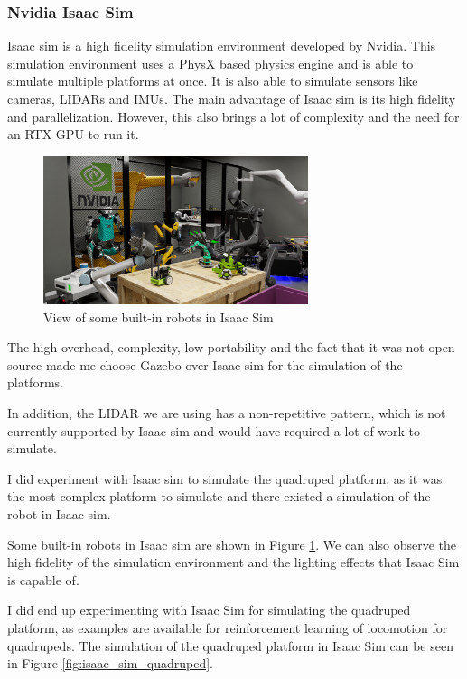 \documentclass[12pt]{article}
\begin{document}
        \subsubsection{Nvidia Isaac Sim}

            Isaac sim is a high fidelity simulation environment developed by Nvidia. This simulation environment uses a PhysX based physics engine and is able to simulate multiple platforms at once. It is also able to simulate sensors like cameras, LIDARs and IMUs. The main advantage of Isaac sim is its high fidelity and parallelization. However, this also brings a lot of complexity and the need for an RTX GPU to run it.
            
            \begin{figure}[H]
                \centering
                \includegraphics[width=0.69\textwidth]{Images/isaac_sim.png}
                \caption{View of some built-in robots in Isaac Sim}
                \label{fig:isaac_sim_robots}
            \end{figure}
            
            The high overhead, complexity, low portability and the fact that it was not open source made me choose Gazebo over Isaac sim for the simulation of the platforms.

            In addition, the LIDAR we are using has a non-repetitive pattern, which is not currently supported by Isaac sim and would have required a lot of work to simulate.

            I did experiment with Isaac sim to simulate the quadruped platform, as it was the most complex platform to simulate and there existed a simulation of the robot in Isaac sim.

            Some built-in robots in Isaac sim are shown in Figure \ref{fig:isaac_sim_robots}. We can also observe the high fidelity of the simulation environment and the lighting effects that Isaac Sim is capable of.

            I did end up experimenting with Isaac Sim for simulating the quadruped platform, as examples are available for reinforcement learning of locomotion for quadrupeds. The simulation of the quadruped platform in Isaac Sim can be seen in Figure \ref{fig:isaac_sim_quadruped}.
\end{document}
